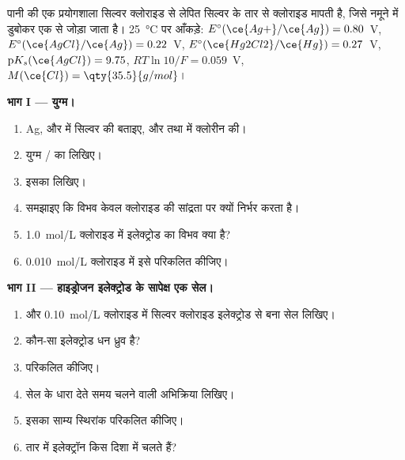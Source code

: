 \begin{problem}
\label{pb:b1:nernst:1}
पानी की एक प्रयोगशाला सिल्वर क्लोराइड से लेपित सिल्वर के तार से क्लोराइड मापती है,
जिसे नमूने में डुबोकर एक  से जोड़ा जाता है।
\qty{25}{\celsius} पर आँकड़े: $E^\circ(\ce{Ag+}/\ce{Ag}) = 0.80$~V,
$E^\circ(\ce{AgCl}/\ce{Ag}) = 0.22$~V, $E^\circ(\ce{Hg2Cl2}/\ce{Hg}) =
0.27$~V, $\mathrm{p}K_s(\ce{AgCl}) = 9.75$, $RT\ln 10/F = 0.059$~V,
$M(\ce{Cl}) = \qty{35.5}{g/mol}$।

\medskip
\noindent\textbf{भाग I --- युग्म।}
\begin{enumerate}
  \item Ag,  और  में सिल्वर की  बताइए,
        और  तथा  में क्लोरीन की।
  \item युग्म / का  लिखिए।
  \item इसका  लिखिए।
  \item समझाइए कि विभव केवल क्लोराइड की
        सांद्रता पर क्यों निर्भर करता है।
  \item \qty{1.0}{mol/L}
        क्लोराइड में इलेक्ट्रोड का विभव क्या है?
  \item \qty{0.010}{mol/L} क्लोराइड में इसे परिकलित कीजिए।
\end{enumerate}

\medskip
\noindent\textbf{भाग II --- हाइड्रोजन इलेक्ट्रोड के सापेक्ष एक सेल।}
\begin{enumerate}[resume]
  \item {} और \qty{0.10}{mol/L} क्लोराइड में
        सिल्वर क्लोराइड इलेक्ट्रोड से बना सेल लिखिए।
  \item कौन-सा इलेक्ट्रोड धन ध्रुव है?
  \item {} परिकलित कीजिए।
  \item सेल के धारा देते समय चलने वाली अभिक्रिया लिखिए।
  \item इसका साम्य स्थिरांक परिकलित कीजिए।
  \item तार में इलेक्ट्रॉन किस दिशा में चलते हैं?
\end{enumerate}


\end{problem}

